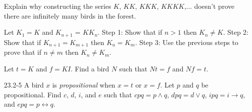 \documentclass[12pt, letterpaper]{article}
\begin{document}
\begin{prob}{22.18} 
Explain why constructing the series $K$, $KK$, $KKK$, $KKKK$,... doesn't prove there are infinitely many birds in the forest.
\end{prob}

\begin{prob}{22.19}
Let $K_1 = K$ and $K_{n+1}$ = $KK_n$. Step 1: Show that if $n > 1$ then $K_n \neq K$. Step 2: Show that if $K_{n+1} = K_{m+1}$ then $K_n = K_m$. Step 3: Use the previous steps to prove that if $n \neq m$ then $K_n \neq K_m$.
\end{prob}

\begin{prob}{23.1}
Let $t = K$ and $f = KI$. Find a bird $N$ such that $Nt = f$ and $Nf = t$.
\end{prob}

\begin{prob}{23.2-5}
A bird $x$ is \emph{propositional} when $x = t$ or $x = f$. Let $p$ and $q$ be propositional. Find $c$, $d$, $i$, and $e$ such that $cpq = p \wedge q$, $dpq = d \vee q$, $ipq = i \to q$, and $epq = p \leftrightarrow q$.
\end{prob}
\end{document}
